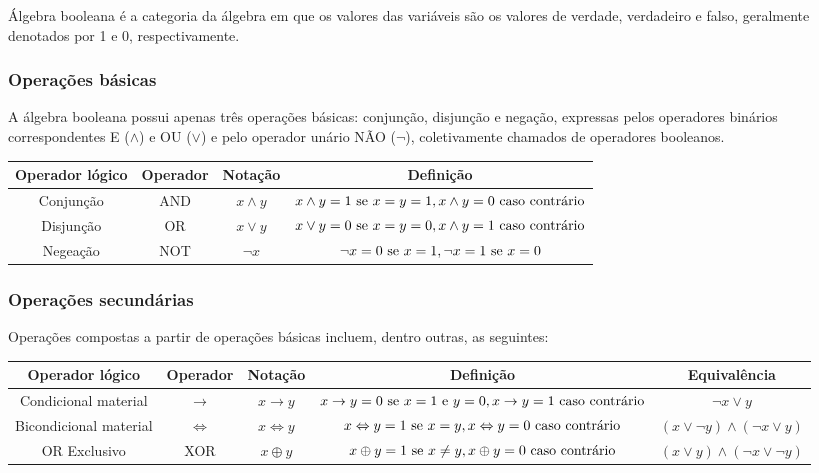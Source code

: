 Álgebra booleana é a categoria da álgebra em que os valores das variáveis são os valores de verdade, verdadeiro e falso, geralmente denotados por 1 e 0, respectivamente.

\subsubsection{Operações básicas}
A álgebra booleana possui apenas três operações básicas: conjunção, disjunção e negação, expressas pelos operadores binários correspondentes E ($\land$) e OU ($\lor$) e pelo operador unário NÃO ($\neg$), coletivamente chamados de operadores booleanos.

\begin{center}
    \begin{tabular}{c|c|c|c}
        Operador lógico & Operador & Notação & Definição\\
        \hline
        Conjunção & AND & $x \land y$  & $x \land y = 1 \textnormal{ se } x=y=1,x \land y = 0 \textnormal{ caso contrário}$ \\
        Disjunção & OR & $x \lor y$ & $x \lor y = 0 \textnormal{ se } x=y=0,x \land y = 1 \textnormal{ caso contrário}$  \\
        Negeação & NOT & $\neg x$ & $\neg x = 0 \textnormal{ se } x=1,\neg x  = 1 \textnormal{ se }x=0$ 
    \end{tabular}
    
\end{center}

\subsubsection{Operações secundárias}
Operações compostas a partir de operações básicas incluem, dentro outras, as seguintes:
\begin{center}
    \begin{tabular}{c|c|c|c|c}
        Operador lógico & Operador & Notação & Definição & Equivalência\\
        \hline
        Condicional material & $\rightarrow$ & $x \rightarrow y$ & $x \rightarrow y = 0 \textnormal{ se } x = 1 \textnormal{ e } y = 0,x \rightarrow y = 1 \textnormal{ caso contrário}$ & $\neg x \lor y$ \\
        Bicondicional material & $\Leftrightarrow$ & $x \Leftrightarrow y$ &$x \Leftrightarrow y = 1 \textnormal{ se } x=y,x \Leftrightarrow y = 0 \textnormal{ caso contrário}$ & $(x \lor \neg y) \land (\neg x \lor y)$\\
        OR Exclusivo & XOR & $x \oplus y$  &$x \oplus y = 1 \textnormal{ se } x\neq y,x \oplus y = 0 \textnormal{ caso contrário}$ & $(x \lor y) \land (\neg x \lor \neg y)$
    \end{tabular}
\end{center}

